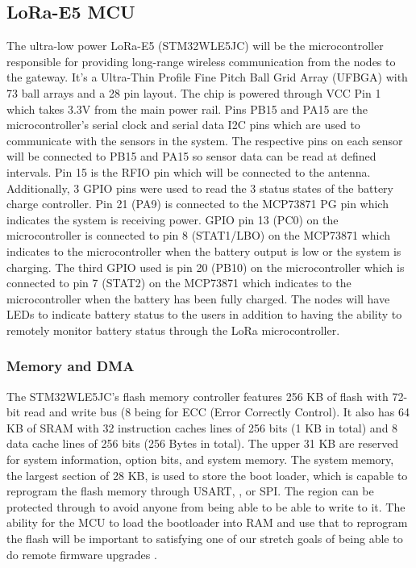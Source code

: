 \subsection{LoRa-E5 MCU}
The ultra-low power LoRa-E5 (STM32WLE5JC) will be the microcontroller responsible for providing
long-range wireless communication from the nodes to the gateway. It's a Ultra-Thin Profile Fine
Pitch Ball Grid Array (UFBGA) with 73 ball arrays and a 28 pin layout. The chip is powered through
VCC Pin 1 which takes 3.3V from the main power rail. Pins PB15 and PA15 are the microcontroller's
serial clock and serial data I2C pins which are used to communicate with the sensors in the system.
The respective pins on each sensor will be connected to PB15 and PA15 so sensor data can be read at
defined intervals. Pin 15 is the RFIO pin which will be connected to the antenna. Additionally,
3 GPIO pins were used to read the 3 status states of the battery charge controller. Pin 21 (PA9) is
connected to the MCP73871 PG pin which indicates the system is receiving power. GPIO pin 13 (PC0) on
the microcontroller is connected to pin 8 (STAT1/LBO) on the MCP73871 which indicates to the
microcontroller when the battery output is low or the system is charging. The third GPIO used is pin
20 (PB10) on the microcontroller which is connected to pin 7 (STAT2) on the MCP73871 which indicates
to the microcontroller when the battery has been fully  charged. The nodes will have LEDs to
indicate battery status to the users in addition to having the ability to remotely monitor battery
status through the LoRa microcontroller. 

\subsubsection{Memory and DMA}
The STM32WLE5JC's flash memory controller features 256 KB of flash with 72-bit read and write bus (8
being for ECC (Error Correctly Control). It also has 64 KB of SRAM with 32 instruction caches lines
of 256 bits (1 KB in total) and 8 data cache lines of 256 bits (256 Bytes in total). The upper 31 KB
are reserved for system information, option bits, and system memory. The system memory, the largest
section of 28 KB, is used to store the boot loader, which is capable to reprogram the flash memory
through USART, \iic, or SPI. The region can be protected through to avoid anyone from being able to
be able to write to it. The ability for the MCU to load the bootloader into RAM and use that to
reprogram the flash will be important to satisfying one of our stretch goals of being able to do
remote firmware upgrades \cite{ds-stm32wle5j8}.

